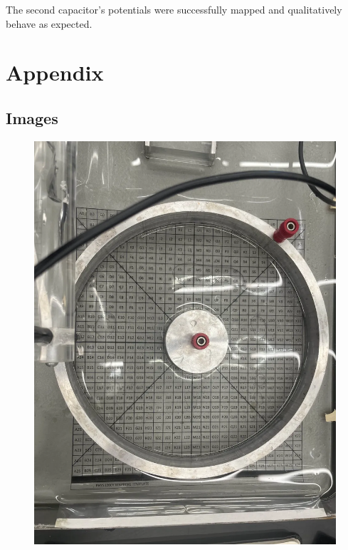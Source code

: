\documentclass[10pt, twocolumn]{article}
\theoremstyle{definition}
\begin{document}
The second capacitor's potentials were successfully mapped and qualitatively behave as expected.
\section{Appendix}
\subsection{Images}

\begin{figure}
  \centering
  \begin{minipage}{.5\textwidth}
    \centering
    \includegraphics[scale=0.2]{cylcap.png}
    \label{fig:ppc-results}
  \end{minipage}%
  \hspace{.1\textwidth}%
  \begin{minipage}{.5\textwidth}

\end{minipage}
\end{figure}
\end{document}
